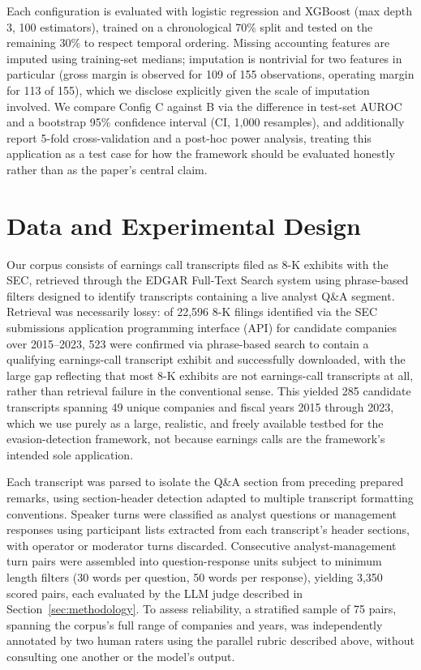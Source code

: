 \documentclass[conference]{IEEEtran}
\begin{document}
Each configuration is evaluated with logistic regression and XGBoost (max depth 3, 100 estimators), trained on a chronological 70\% split and tested on the remaining 30\% to respect temporal ordering. Missing accounting features are imputed using training-set medians; imputation is nontrivial for two features in particular (gross margin is observed for 109 of 155 observations, operating margin for 113 of 155), which we disclose explicitly given the scale of imputation involved. We compare Config C against B via the difference in test-set AUROC and a bootstrap 95\% confidence interval (CI, 1,000 resamples), and additionally report 5-fold cross-validation and a post-hoc power analysis, treating this application as a test case for how the framework should be evaluated honestly rather than as the paper's central claim.

\section{Data and Experimental Design}
\label{sec:data}

Our corpus consists of earnings call transcripts filed as 8-K exhibits with the SEC, retrieved through the EDGAR Full-Text Search system using phrase-based filters designed to identify transcripts containing a live analyst Q\&A segment. Retrieval was necessarily lossy: of 22,596 8-K filings identified via the SEC submissions application programming interface (API) for candidate companies over 2015--2023, 523 were confirmed via phrase-based search to contain a qualifying earnings-call transcript exhibit and successfully downloaded, with the large gap reflecting that most 8-K exhibits are not earnings-call transcripts at all, rather than retrieval failure in the conventional sense. This yielded 285 candidate transcripts spanning 49 unique companies and fiscal years 2015 through 2023, which we use purely as a large, realistic, and freely available testbed for the evasion-detection framework, not because earnings calls are the framework's intended sole application.

Each transcript was parsed to isolate the Q\&A section from preceding prepared remarks, using section-header detection adapted to multiple transcript formatting conventions. Speaker turns were classified as analyst questions or management responses using participant lists extracted from each transcript's header sections, with operator or moderator turns discarded. Consecutive analyst-management turn pairs were assembled into question-response units subject to minimum length filters (30 words per question, 50 words per response), yielding 3,350 scored pairs, each evaluated by the LLM judge described in Section~\ref{sec:methodology}. To assess reliability, a stratified sample of 75 pairs, spanning the corpus's full range of companies and years, was independently annotated by two human raters using the parallel rubric described above, without consulting one another or the model's output.
\end{document}
